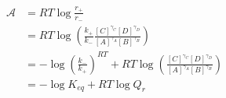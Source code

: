 \begin{eqnarray}\label{eqn:reaction-affinity-ratio}
\mathcal A &= RT\log\frac{r_+}{r_-} \\
& = RT\log\left(\frac{k_+}{k_-}\frac{[C]^{\gamma_C}[D]^{\gamma_D}}{[A]^{\gamma_A}[B]^{\gamma_B}}\right) \\

& = -\log\left(\frac{k_-}{k_+}\right)^{RT} + RT\log\left(\frac{[C]^{\gamma_C}[D]^{\gamma_D}}{[A]^{\gamma_A}[B]^{\gamma_B}}\right) \\
& = -\log K_{eq} + RT\log{Q_r} \\
\end{eqnarray}
